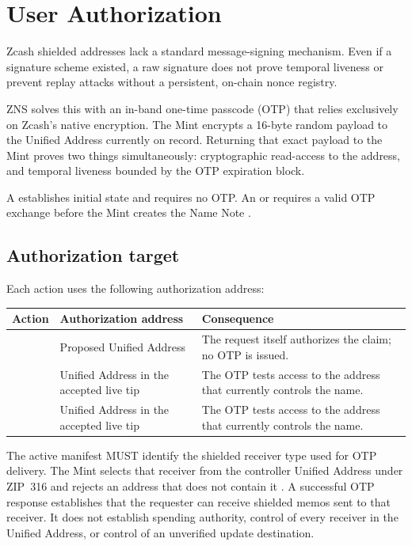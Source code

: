\section{User Authorization}
\label{sec:authorization}

Zcash shielded addresses lack a standard message-signing mechanism. Even if a signature scheme existed, a raw signature does not prove temporal liveness or prevent replay attacks without a persistent, on-chain nonce registry.

ZNS solves this with an in-band one-time passcode (OTP) that relies exclusively on Zcash's native encryption. The Mint encrypts a 16-byte random payload to the Unified Address currently on record. Returning that exact payload to the Mint proves two things simultaneously: cryptographic read-access to the address, and temporal liveness bounded by the OTP expiration block.

A  establishes initial state and requires no OTP. An  or  requires a valid OTP exchange before the Mint creates the Name Note \cite{zns-mint}.

\begin{center}
\znsauthorizationflow
\end{center}
\subsection{Authorization target}

Each action uses the following authorization address:

\begin{center}
\begin{tabularx}{\textwidth}{@{}lYY@{}}
\toprule
Action & Authorization address & Consequence \\
\midrule
{} & Proposed Unified Address & The request itself authorizes the claim; no OTP is issued. \\
 & Unified Address in the accepted live tip & The OTP tests access to the address that currently controls the name. \\
 & Unified Address in the accepted live tip & The OTP tests access to the address that currently controls the name. \\
\bottomrule
\end{tabularx}
\end{center}

The active manifest MUST identify the shielded receiver type used for OTP delivery.
The Mint selects that receiver from the controller Unified Address under ZIP~316 and rejects an address that does not contain it \cite{zip316}.
A successful OTP response establishes that the requester can receive shielded memos sent to that receiver.
It does not establish spending authority, control of every receiver in the Unified Address, or control of an unverified update destination.

